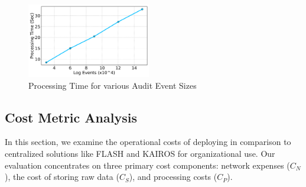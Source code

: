  \begin{figure}[t!]
  \centering
  \includegraphics[width=0.48\textwidth]{fig/sizevstime.pdf}
  \caption{Processing Time for various Audit Event Sizes}
  \label{sizevstime}
  \vspace{-2ex}
\end{figure}




\subsection{Cost Metric Analysis}
In this section, we examine the operational costs of deploying \Sys in comparison to centralized solutions like FLASH and KAIROS for organizational use. Our evaluation concentrates on three primary cost components: network expenses (\(C_{N}\)), the cost of storing raw data (\(C_{S}\)), and processing costs (\(C_{P}\)).

